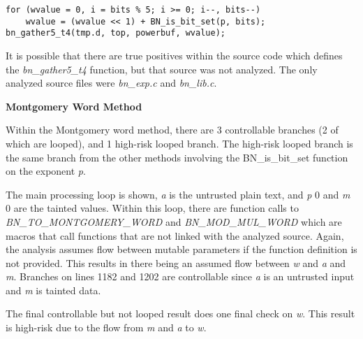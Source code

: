 \documentclass[11pt,a4paper]{article}
\newcommand{\codevar}[1]{\textit{#1}}
\newcommand{\codefn}[1]{\textit{#1}}
\newcommand{\codefile}[1]{\textit{#1}}
\newcommand{\ruleabove}{}
\newcommand{\rulebelow}{}
\begin{document}
  
\ruleabove
\begin{lstlisting}[caption=OpenSSL 1.1.0g - bn\_exp.c lines 852-854]
for (wvalue = 0, i = bits % 5; i >= 0; i--, bits--)
    wvalue = (wvalue << 1) + BN_is_bit_set(p, bits);
bn_gather5_t4(tmp.d, top, powerbuf, wvalue);
\end{lstlisting}
\rulebelow

  It is possible that there are true positives within the source code which
  defines the \codefn{bn\_gather5\_t4} function, but that source was not analyzed. The only
  analyzed source files were \codefile{bn\_exp.c} and \codefile{bn\_lib.c}.

\noindent
\textbf{Montgomery Word Method}


   Within the Montgomery word method, there are 3 controllable branches (2 of
   which are looped), and 1 high-risk looped branch. The high-risk looped branch
   is the same branch from the other methods involving the BN\_is\_bit\_set
   function on the exponent \codevar{p}.

   The main processing loop is shown, \codevar{a} is the untrusted plain text,
   and \codevar{p} 0 and \codevar{m} 0 are the tainted values. Within this loop,
   there are function calls to \codefn{BN\_TO\_MONTGOMERY\_WORD} and
   \codefn{BN\_MOD\_MUL\_WORD} which are macros that call functions that are not
   linked with the analyzed source. Again, the analysis assumes flow between
   mutable parameters if the function definition is not provided. This results in
   there being an assumed flow between \codevar{w} and \codevar{a} and \codevar{m}.
   Branches on lines 1182 and 1202 are controllable since \codevar{a} is an
   untrusted input and \codevar{m} is tainted data.

   The final controllable but not looped result does one final check on \codevar{w}.
   This result is high-risk due to the flow from \codevar{m} and \codevar{a} to \codevar{w}.
\end{document}
